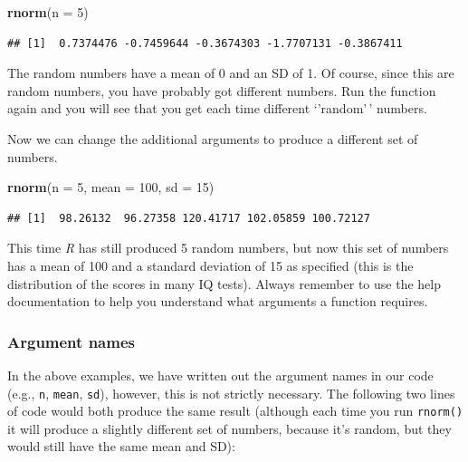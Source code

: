 \documentclass[
]{scrartcl}
\newenvironment{Shaded}{\begin{snugshade}}{\end{snugshade}}
\newcommand{\AttributeTok}[1]{\textcolor[rgb]{0.13,0.29,0.53}{#1}}
\newcommand{\DecValTok}[1]{\textcolor[rgb]{0.00,0.00,0.81}{#1}}
\newcommand{\FunctionTok}[1]{\textcolor[rgb]{0.13,0.29,0.53}{\textbf{#1}}}
\newcommand{\NormalTok}[1]{#1}
\begin{document}
\begin{Shaded}
\begin{Highlighting}[]
\FunctionTok{rnorm}\NormalTok{(}\AttributeTok{n =} \DecValTok{5}\NormalTok{)}
\end{Highlighting}
\end{Shaded}

\begin{verbatim}
## [1]  0.7374476 -0.7459644 -0.3674303 -1.7707131 -0.3867411
\end{verbatim}

The random numbers have a mean of 0 and an SD of 1. Of course, since
this are random numbers, you have probably got different numbers. Run
the function again and you will see that you get each time different
`'random'\,' numbers.

Now we can change the additional arguments to produce a different set of
numbers.

\begin{Shaded}
\begin{Highlighting}[]
\FunctionTok{rnorm}\NormalTok{(}\AttributeTok{n =} \DecValTok{5}\NormalTok{, }\AttributeTok{mean =} \DecValTok{100}\NormalTok{, }\AttributeTok{sd =} \DecValTok{15}\NormalTok{)}
\end{Highlighting}
\end{Shaded}

\begin{verbatim}
## [1]  98.26132  96.27358 120.41717 102.05859 100.72127
\end{verbatim}

This time \emph{R} has still produced 5 random numbers, but now this set of
numbers has a mean of 100 and a standard deviation of 15 as specified
(this is the distribution of the scores in many IQ tests). Always
remember to use the help documentation to help you understand what
arguments a function requires.

\subsubsection{Argument names}\label{argument-names}

In the above examples, we have written out the argument names in our
code (e.g., \texttt{n}, \texttt{mean}, \texttt{sd}), however, this is not strictly necessary.
The following two lines of code would both produce the same result
(although each time you run \texttt{rnorm()} it will produce a slightly
different set of numbers, because it's random, but they would still have
the same mean and SD):
\end{document}
